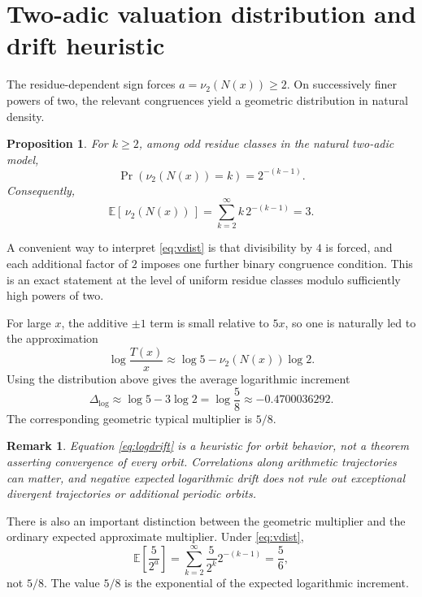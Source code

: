 \documentclass[11pt]{article}
\newtheorem{proposition}{Proposition}
\newtheorem{remark}{Remark}
\newcommand{\vTwo}{\nu_2}
\begin{document}
\section{Two-adic valuation distribution and drift heuristic}

The residue-dependent sign forces \(a=\vTwo(N(x))\ge2\). On successively finer powers of two, the relevant congruences yield a geometric distribution in natural density.

\begin{proposition}
For \(k\ge2\), among odd residue classes in the natural two-adic model,
\begin{equation}
\Pr(\vTwo(N(x))=k)=2^{-(k-1)}.
\label{eq:vdist}
\end{equation}
Consequently,
\[
\mathbb{E}[\,\vTwo(N(x))\,]
=
\sum_{k=2}^{\infty}k\,2^{-(k-1)}
=3.
\]
\end{proposition}

A convenient way to interpret \eqref{eq:vdist} is that divisibility by \(4\) is forced, and each additional factor of \(2\) imposes one further binary congruence condition. This is an exact statement at the level of uniform residue classes modulo sufficiently high powers of two.

For large \(x\), the additive \(\pm1\) term is small relative to \(5x\), so one is naturally led to the approximation
\[
\log\frac{T(x)}{x}
\approx
\log5-\vTwo(N(x))\log2.
\]
Using the distribution above gives the average logarithmic increment
\begin{equation}
\Delta_{\log}
\approx
\log5-3\log2
=
\log\frac58
\approx-0.4700036292.
\label{eq:logdrift}
\end{equation}
The corresponding geometric typical multiplier is \(5/8\).

\begin{remark}
Equation \eqref{eq:logdrift} is a heuristic for orbit behavior, not a theorem asserting convergence of every orbit. Correlations along arithmetic trajectories can matter, and negative expected logarithmic drift does not rule out exceptional divergent trajectories or additional periodic orbits.
\end{remark}

There is also an important distinction between the geometric multiplier and the ordinary expected approximate multiplier. Under \eqref{eq:vdist},
\[
\mathbb{E}\!\left[\frac{5}{2^a}\right]
=
\sum_{k=2}^{\infty}\frac{5}{2^k}2^{-(k-1)}
=
\frac56,
\]
not \(5/8\). The value \(5/8\) is the exponential of the expected logarithmic increment.
\end{document}
